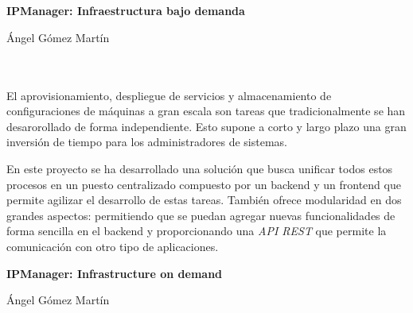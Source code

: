 

\cleardoublepage

\chapter*{}
\thispagestyle{empty}

\begin{center}
{\large\bfseries IPManager: Infraestructura bajo demanda}\\
\end{center}
\begin{center}
Ángel Gómez Martín
\end{center}

\\

\vspace{0.7cm}
\\

El aprovisionamiento, despliegue de servicios y almacenamiento de configuraciones de máquinas a gran escala son tareas que tradicionalmente se han desarorollado de forma independiente. Esto supone a corto y largo plazo una gran inversión de tiempo para los administradores de sistemas.

\bigskip
En este proyecto se ha desarrollado una solución que busca unificar todos estos procesos en un puesto centralizado compuesto por un backend y un frontend que permite agilizar el desarrollo de estas tareas. También ofrece modularidad en dos grandes aspectos: permitiendo que se puedan agregar nuevas funcionalidades de forma sencilla en el backend y proporcionando una \textit{API REST} que permite la comunicación con otro tipo de aplicaciones.


\cleardoublepage
\thispagestyle{empty}

\begin{center}
{\large\bfseries IPManager: Infrastructure on demand}\\
\end{center}
\begin{center}
Ángel Gómez Martín
\end{center}

\\

\vspace{0.7cm}
\\

